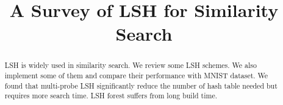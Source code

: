 \documentclass{IEEEtran}
\begin{document}
\title{A Survey of LSH for Similarity Search}
\author{
 \and
{}
}
\maketitle
\thispagestyle{plain}
\pagestyle{plain}

\begin{abstract}
  LSH is widely used in similarity search.
  We review some LSH schemes.
  We also implement some of them and compare their performance with MNIST dataset.
  We found that multi-probe LSH significantly reduce the number of hash table needed but requires more search time. LSH forest suffers from long build time.
\end{abstract}






\clearpage


\end{document}
